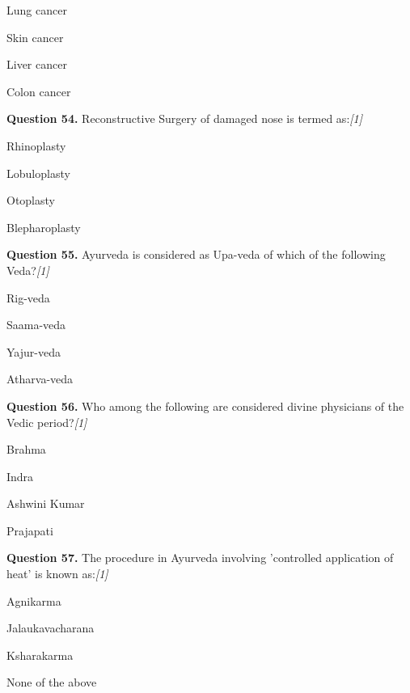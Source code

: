 \documentclass[11pt,a4paper]{article}
\newcommand{\pts}[1]{\hfill   \textit{[#1]}}
\begin{document}
\begin{parts}
  \item Lung cancer
  \item Skin cancer
  \item Liver cancer
  \item Colon cancer
\end{parts}

\medskip


\noindent   \textbf{Question 54.} Reconstructive Surgery of damaged nose is termed as:\pts{1}

\begin{parts}
  \item Rhinoplasty
  \item Lobuloplasty
  \item Otoplasty
  \item Blepharoplasty
\end{parts}

\medskip


\noindent   \textbf{Question 55.} Ayurveda is considered as Upa-veda of which of the following Veda?\pts{1}

\begin{parts}
  \item Rig-veda
  \item Saama-veda
  \item Yajur-veda
  \item Atharva-veda
\end{parts}

\medskip


\noindent   \textbf{Question 56.} Who among the following are considered divine physicians of the Vedic period?\pts{1}

\begin{parts}
  \item Brahma
  \item Indra
  \item Ashwini Kumar
  \item Prajapati
\end{parts}

\medskip


\noindent   \textbf{Question 57.} The procedure in Ayurveda involving 'controlled application of heat' is known as:\pts{1}

\begin{parts}
  \item Agnikarma
  \item Jalaukavacharana
  \item Ksharakarma
  \item None of the above
\end{parts}
\end{document}
